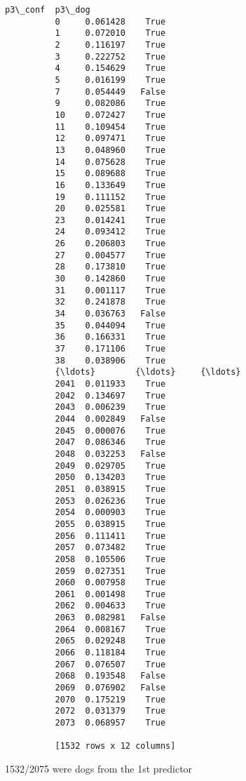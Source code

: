 \documentclass[11pt]{article}
\begin{document}
\begin{Verbatim}[commandchars=\\\{\}]
                 p3\_conf  p3\_dog  
          0     0.061428    True  
          1     0.072010    True  
          2     0.116197    True  
          3     0.222752    True  
          4     0.154629    True  
          5     0.016199    True  
          7     0.054449   False  
          9     0.082086    True  
          10    0.072427    True  
          11    0.109454    True  
          12    0.097471    True  
          13    0.048960    True  
          14    0.075628    True  
          15    0.089688    True  
          16    0.133649    True  
          19    0.111152    True  
          20    0.025581    True  
          23    0.014241    True  
          24    0.093412    True  
          26    0.206803    True  
          27    0.004577    True  
          28    0.173810    True  
          30    0.142860    True  
          31    0.001117    True  
          32    0.241878    True  
          34    0.036763   False  
          35    0.044094    True  
          36    0.166331    True  
          37    0.171106    True  
          38    0.038906    True  
          {\ldots}        {\ldots}     {\ldots}  
          2041  0.011933    True  
          2042  0.134697    True  
          2043  0.006239    True  
          2044  0.002849   False  
          2045  0.000076    True  
          2047  0.086346    True  
          2048  0.032253   False  
          2049  0.029705    True  
          2050  0.134203    True  
          2051  0.038915    True  
          2053  0.026236    True  
          2054  0.000903    True  
          2055  0.038915    True  
          2056  0.111411    True  
          2057  0.073482    True  
          2058  0.105506    True  
          2059  0.027351    True  
          2060  0.007958    True  
          2061  0.001498    True  
          2062  0.004633    True  
          2063  0.082981   False  
          2064  0.008167    True  
          2065  0.029248    True  
          2066  0.118184    True  
          2067  0.076507    True  
          2068  0.193548   False  
          2069  0.076902   False  
          2070  0.175219    True  
          2072  0.031379    True  
          2073  0.068957    True  
          
          [1532 rows x 12 columns]
\end{Verbatim}
            
    1532/2075 were dogs from the 1st predictor
\end{document}
